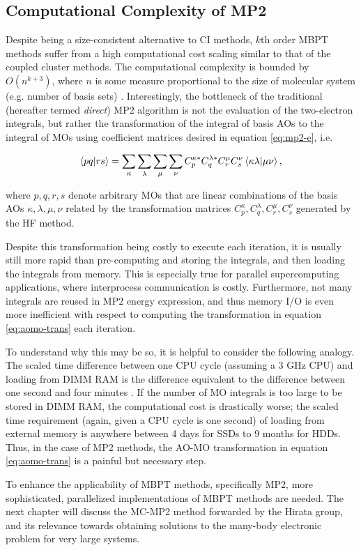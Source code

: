 \subsection{Computational Complexity of MP2}

Despite being a size-consistent alternative to CI methods, $k$th order MBPT
methods suffer from a high computational cost scaling similar to that of the
coupled cluster methods. The computational complexity is bounded by
$O(n^{k+3})$, where $n$ is some measure proportional to the size of molecular
system (e.g. number of basis sets) \cite{mbpt-book, mp2-direct}. Interestingly,
the bottleneck of the traditional (hereafter termed \emph{direct}) MP2 algorithm
is not the evaluation of the two-electron integrals, but rather the
transformation of the integral of basis AOs to the integral of MOs using
coefficient matrices desired in equation \ref{eq:mp2-e}, i.e.

\begin{equation}
	\braket{pq|rs} = \sum_\kappa \sum_\lambda \sum_\mu \sum_\nu
	C_p^{\kappa *} C_q^{\lambda *} C_r^\mu C_s^\nu \braket{\kappa\lambda | \mu\nu},
	\label{eq:aomo-trans}
\end{equation}

\noindent where $p,q,r,s$ denote arbitrary MOs that are linear combinations of
the basis AOs $\kappa,\lambda,\mu,\nu$ related by the transformation matrices
$C_p^{\kappa}, C_q^{\lambda}, C_r^\mu, C_s^\nu$ generated by the HF method.

Despite this transformation being costly to execute each iteration, it is
usually still more rapid than pre-computing and storing the integrals, and then
loading the integrals from memory. This is especially true for parallel
supercomputing applications, where interprocess communication is costly.
Furthermore, not many integrals are reused in MP2 energy expression, and thus
memory I/O is even more inefficient with respect to computing the transformation
in equation \ref{eq:aomo-trans} each iteration.

To understand why this may be so, it is helpful to consider the following
analogy. The scaled time difference between one CPU cycle (assuming a 3 GHz CPU)
and loading from DIMM RAM is the difference equivalent to the difference between
one second and four minutes \cite{systems}. If the number of MO integrals is too
large to be stored in DIMM RAM, the computational cost is drastically worse; the
scaled time requirement (again, given a CPU cycle is one second) of loading from
external memory is anywhere between 4 days for SSDs to 9 months for HDDs.  Thus,
in the case of MP2 methods, the AO-MO transformation in equation
\ref{eq:aomo-trans} is a painful but necessary step.

To enhance the applicability of MBPT methods, specifically MP2, more
sophisticated, parallelized implementations of MBPT methods are needed. The next
chapter will discuss the MC-MP2 method forwarded by the Hirata group, and its
relevance towards obtaining solutions to the many-body electronic problem for
very large systems.

